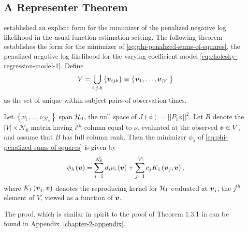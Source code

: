 

\subsection{A Representer Theorem}

\cite{wahba1990spline} established an explicit form for the minimizer of the penalized negative log likelihood in the usual function estimation setting. The following theorem establishes the form for the minimizer of \eqref{eq:phi-penalized-sums-of-squares}, the penalized negative log likelihood for the varying coefficient model \eqref{eq:cholesky-regression-model-1}. Define  
\[
V = \bigcup\limits_{i,j,k} \left\{\mbox{\boldmath $v$}_{ijk} \right\} \equiv \left\{ \mbox{\boldmath $v$}_1,\dots,\mbox{\boldmath $v$}_{\vert V \vert} \right\}
\]
\noindent
as the set of unique within-subject pairs of observation times. 

 \begin{theorem} \label{theorem:finite-dimensional-minimizer}
 Let $\left\{\nu_1,\dots, \nu_{\mathcal{N}_0}\right\}$ span $\mathcal{H}_0$, the null space of $J\left(\phi\right) = \vert \vert P_1 \phi\vert\vert^2$. Let $B$ denote the $\vert V \vert \times \mathcal{N}_0$ matrix having $i^{th}$ column equal to $\nu_i$ evaluated at the observed $\mbox{\boldmath $v$} \in V$, and assume that $B$ has full column rank. Then the minimizer $\phi_\lambda$ of \eqref{eq:phi-penalized-sums-of-squares} is given by
 \begin{equation} \label{eq:form-of-the-minimizer-phi}
\phi_\lambda\left(\mbox{\boldmath $v$}\right) = \sum_{i = 1}^{\mathcal{N}_0} d_i \nu_{i}\left(\mbox{\boldmath $v$}\right) + \sum_{j = 1}^{\vert V \vert} c_j K_1\left(\mbox{\boldmath $v$}_j, \mbox{\boldmath $v$}\right),
\end{equation}
\noindent
where $K_1\left(\mbox{\boldmath $v$}_j, \mbox{\boldmath $v$} \right)$ denotes the reproducing kernel for $\mathcal{H}_1$ evaluated at ${\mbox{\boldmath $v$}_j}$, the $j^{th}$ element of $V$, viewed as a function of $\mbox{\boldmath $v$}$.
\end{theorem}
\vspace{0.5cm}
\noindent
The proof, which is similar in spirit to the proof of Theorem 1.3.1 in \cite{wahba1990spline} can be found in Appendix~\ref{chapter-2-appendix}.


